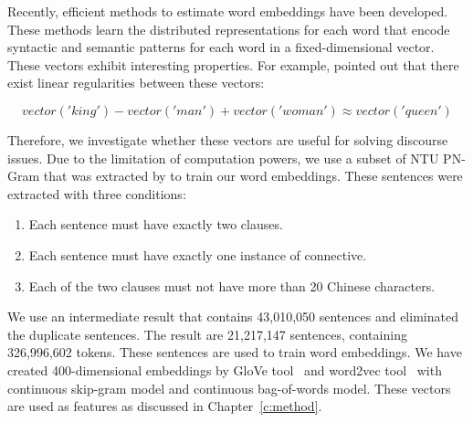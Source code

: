 Recently, efficient methods to estimate word embeddings have been developed.
These methods learn the distributed representations for each word that encode
syntactic and semantic patterns for each word in a fixed-dimensional vector.
These vectors exhibit interesting properties. For example,
\cite{mikolov2013linguistic} pointed out that there exist linear regularities
between these vectors:

$$ vector('king') - vector('man') + vector('woman') \approx vector('queen') $$

Therefore, we investigate whether these vectors are useful for solving
discourse issues. Due to the limitation of computation powers, we use
a subset of NTU PN-Gram that was extracted by \cite{huang2014interpretation}
to train our word embeddings. These sentences were extracted with three conditions:

\begin{enumerate}
\item Each sentence must have exactly two clauses.
\item Each sentence must have exactly one instance of connective.
\item Each of the two clauses must not have more than 20 Chinese characters.
\end{enumerate}

We use an intermediate result that contains 43,010,050 sentences and eliminated
the duplicate sentences. The result are 21,217,147 sentences, containing
326,996,602 tokens. These sentences are used to train word embeddings.
We have created 400-dimensional embeddings by GloVe tool~\citep{pennington2014glove}
and word2vec tool~\citep{mikolov2013efficient,mikolov2013distributed} with
continuous skip-gram model and continuous bag-of-words model.
These vectors are used as features as discussed in Chapter~\ref{c:method}.
